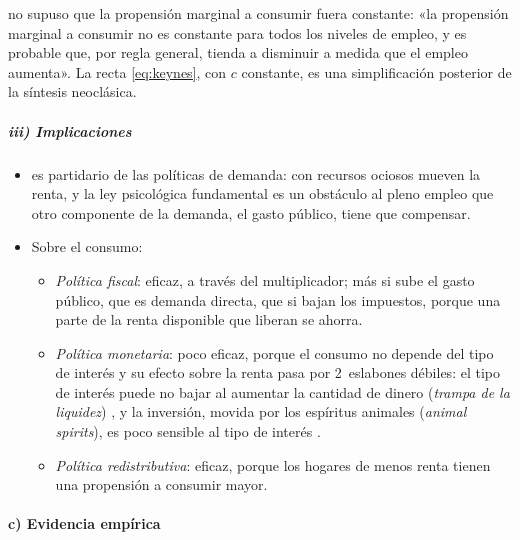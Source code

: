 \documentclass[11pt]{article}
\begin{document}
\begin{anotaciones}
 no supuso que la propensión marginal a consumir fuera constante: «la propensión marginal a consumir no es constante para todos los niveles de empleo, y es probable que, por regla general, tienda a disminuir a medida que el empleo aumenta»\nocite{Keynes1936}. La recta \eqref{eq:keynes}, con $c$ constante, es una simplificación posterior de la síntesis neoclásica.
\end{anotaciones}

\subparagraph{iii) Implicaciones}

\begin{itemize}
\item {} es partidario de las políticas de demanda: con recursos ociosos mueven la renta, y la ley psicológica fundamental es un obstáculo al pleno empleo que otro componente de la demanda, el gasto público, tiene que compensar.
\item Sobre el consumo:
  \begin{itemize}
  \item \emph{Política fiscal}: eficaz, a través del multiplicador; más si sube el gasto público, que es demanda directa, que si bajan los impuestos, porque una parte de la renta disponible que liberan se ahorra.
  \item \emph{Política monetaria}: poco eficaz, porque el consumo no depende del tipo de interés y su efecto sobre la renta pasa por 2~eslabones débiles: el tipo de interés puede no bajar al aumentar la cantidad de dinero (\emph{trampa de la liquidez}) , y la inversión, movida por los espíritus animales (\emph{animal spirits}), es poco sensible al tipo de interés .
  \item \emph{Política redistributiva}: eficaz, porque los hogares de menos renta tienen una propensión a consumir mayor.
  \end{itemize}
\end{itemize}

\paragraph{c) Evidencia empírica}
\end{document}
